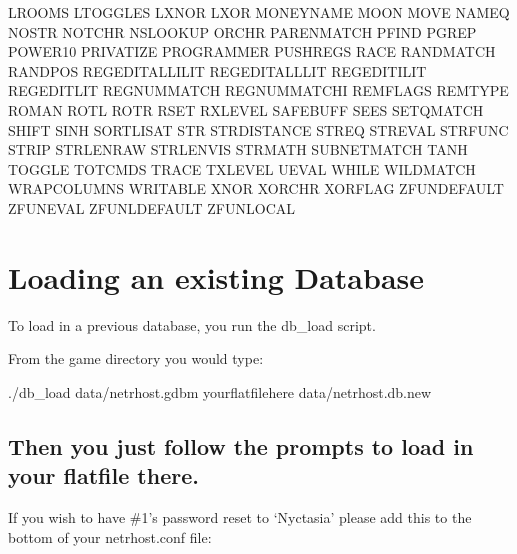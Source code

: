 \documentclass[letterpaper,10pt,english]{sphinxmanual}
\begin{document}
LROOMS                       LTOGGLES                      LXNOR
LXOR                         MONEYNAME                     MOON
MOVE                         NAMEQ                         NOSTR
NOTCHR                       NSLOOKUP                      ORCHR
PARENMATCH                   PFIND                         PGREP
POWER10                      PRIVATIZE                     PROGRAMMER
PUSHREGS                     RACE                          RANDMATCH
RANDPOS                      REGEDITALLILIT                REGEDITALLLIT
REGEDITILIT                  REGEDITLIT                    REGNUMMATCH
REGNUMMATCHI                 REMFLAGS                      REMTYPE
ROMAN                        ROTL                          ROTR
RSET                         RXLEVEL                       SAFEBUFF
SEES                         SETQMATCH                     SHIFT
SINH                         SORTLISAT                     STR
STRDISTANCE                  STREQ                         STREVAL
STRFUNC                      STRIP                         STRLENRAW
STRLENVIS                    STRMATH                       SUBNETMATCH
TANH                         TOGGLE                        TOTCMDS
TRACE                        TXLEVEL                       UEVAL
WHILE                        WILDMATCH                     WRAPCOLUMNS
WRITABLE                     XNOR                          XORCHR
XORFLAG                      ZFUNDEFAULT                   ZFUNEVAL
ZFUNLDEFAULT                 ZFUNLOCAL


\chapter{Loading an existing Database}
\label{\detokenize{32-dbloading:loading-an-existing-database}}\label{\detokenize{32-dbloading::doc}}
\sphinxAtStartPar
To load in a previous database, you run the db\_load script.

\sphinxAtStartPar
From the game directory you would type:

\sphinxAtStartPar
./db\_load data/netrhost.gdbm yourflatfilehere data/netrhost.db.new


\section{Then you just follow the prompts to load in your flatfile there.}
\label{\detokenize{32-dbloading:then-you-just-follow-the-prompts-to-load-in-your-flatfile-there}}
\sphinxAtStartPar
If you wish to have \#1’s password reset to ‘Nyctasia’ please add this
to the bottom of your netrhost.conf file:
\end{document}
